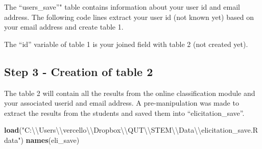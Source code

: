 \documentclass[]{article}
\newenvironment{Shaded}{\begin{snugshade}}{\end{snugshade}}
\newcommand{\KeywordTok}[1]{\textcolor[rgb]{0.13,0.29,0.53}{\textbf{#1}}}
\newcommand{\CharTok}[1]{\textcolor[rgb]{0.31,0.60,0.02}{#1}}
\newcommand{\StringTok}[1]{\textcolor[rgb]{0.31,0.60,0.02}{#1}}
\newcommand{\OperatorTok}[1]{\textcolor[rgb]{0.81,0.36,0.00}{\textbf{#1}}}
\newcommand{\NormalTok}[1]{#1}
\begin{document}
The ``users\_save''" table contains information about your user id and
email address. The following code lines extract your user id (not known
yet) based on your email address and create table 1.

The ``id'' variable of table 1 is your joined field with table 2 (not
created yet).

\begin{Shaded}
\end{Shaded}

\subsection{Step 3 - Creation of table
2}\label{step-3---creation-of-table-2}

The table 2 will contain all the results from the online classification
module and your associated userid and email address. A pre-manipulation
was made to extract the results from the students and saved them into
``elicitation\_save''.

\begin{Shaded}
\begin{Highlighting}[]
\KeywordTok{load}\NormalTok{(}\StringTok{"C:}\CharTok{\textbackslash{}\textbackslash{}}\StringTok{Users}\CharTok{\textbackslash{}\textbackslash{}}\StringTok{vercello}\CharTok{\textbackslash{}\textbackslash{}}\StringTok{Dropbox}\CharTok{\textbackslash{}\textbackslash{}}\StringTok{QUT}\CharTok{\textbackslash{}\textbackslash{}}\StringTok{STEM}\CharTok{\textbackslash{}\textbackslash{}}\StringTok{Data}\CharTok{\textbackslash{}\textbackslash{}}\StringTok{elicitation_save.Rdata"}\NormalTok{)}
\KeywordTok{names}\NormalTok{(eli_save)}
\end{Highlighting}
\end{Shaded}
\end{document}
